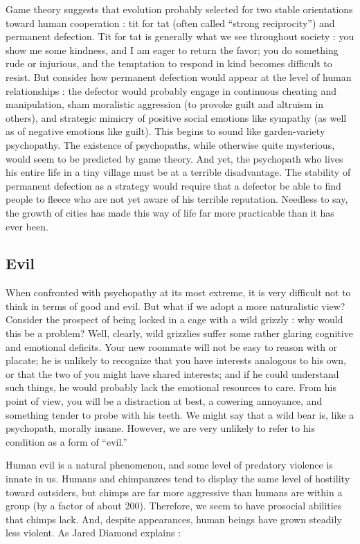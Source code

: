 \documentclass[a4paper,14pt]{extbook}
\begin{document}
Game theory suggests that evolution probably selected for two stable orientations toward human cooperation :
tit for tat (often called ``strong reciprocity'') and permanent defection.
Tit for tat is generally what we see throughout society :
you show me some kindness, and I am eager to return the favor;
you do something rude or injurious, and the temptation to respond in kind becomes difficult to resist.
But consider how permanent defection would appear at the level of human relationships :
the defector would probably engage in continuous cheating and manipulation, sham moralistic aggression (to provoke guilt and altruism in others), and strategic mimicry of positive social emotions like sympathy (as well as of negative emotions like guilt).
This begins to sound like garden-variety psychopathy.
The existence of psychopaths, while otherwise quite mysterious, would seem to be predicted by game theory.
And yet, the psychopath who lives his entire life in a tiny village must be at a terrible disadvantage.
The stability of permanent defection as a strategy would require that a defector be able to find people to fleece who are not yet aware of his terrible reputation.
Needless to say, the growth of cities has made this way of life far more practicable than it has ever been.

\subsection{Evil}

When confronted with psychopathy at its most extreme, it is very difficult not to think in terms of good and evil.
But what if we adopt a more naturalistic view?
Consider the prospect of being locked in a cage with a wild grizzly :
why would this be a problem?
Well, clearly, wild grizzlies suffer some rather glaring cognitive and emotional deficits.
Your new roommate will not be easy to reason with or placate;
he is unlikely to recognize that you have interests analogous to his own, or that the two of you might have shared interests;
and if he could understand such things, he would probably lack the emotional resources to care.
From his point of view, you will be a distraction at best, a cowering annoyance, and something tender to probe with his teeth.
We might say that a wild bear is, like a psychopath, morally insane.
However, we are very unlikely to refer to his condition as a form of ``evil.''

Human evil is a natural phenomenon, and some level of predatory violence is innate in us.
Humans and chimpanzees tend to display the same level of hostility toward outsiders, but chimps are far more aggressive than humans are within a group (by a factor of about 200).
Therefore, we seem to have prosocial abilities that chimps lack.
And, despite appearances, human beings have grown steadily less violent.
As Jared Diamond explains :
\end{document}
